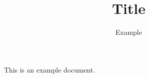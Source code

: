\documentclass[a4paper,12pt,plain]{article}
\author{Example}
\title{Title}
\begin{document}
\maketitle
This is an example document.
\end{document}

